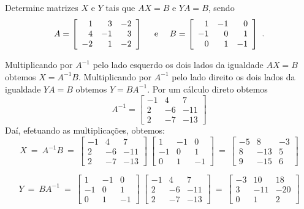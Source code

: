 \begin{problem}
Determine matrizes $X$ e $Y$ tais que $AX=B$ e $YA=B$, sendo
$$A = \left[\begin{array}{rrr}
	1 &  3 & -2  \\
	4 & -1 &  3  \\
 -2 &  1 & -2  \end{array}\right] \ \ \ \ {\rm e} \ \ \ \
B = \left[\begin{array}{rrr}
	1 & -1 &  0  \\
 -1 &  0 &  1  \\
	0 &  1 & -1  \end{array}\right] \ . $$
\end{problem}
\begin{solution}
Multiplicando por $A^{-1}$ pelo lado esquerdo os dois lados da igualdade \linebreak $AX=B$ obtemos $X = A^{-1} B$.
Multiplicando por $A^{-1}$ pelo lado direito  os dois \linebreak lados da igualdade $YA=B$ obtemos $Y = B A^{-1}$.
Por um cálculo direto obtemos 
$$A^{-1} = \left[ \begin{array}{rrr}
-1 &    4 &    7  \\
 2 &   -6 &  -11  \\
 2 &   -7 &  -13 
\end{array} \right]$$
Daí, efetuando as multiplicações, obtemos:
$$X\ =\ A^{-1} B\ =\ 
\left[ \begin{array}{rrr}
-1 &    4 &    7  \\
 2 &   -6 &  -11  \\
 2 &   -7 &  -13 
\end{array} \right]\ 
\left[\begin{array}{rrr}
	1 & -1 &  0  \\
 -1 &  0 &  1  \\
	0 &  1 & -1  \end{array}\right]\ =\ 
\left[\begin{array}{rrr}
 -5 &   8 & -3  \\
	8 & -13 &  5  \\
	9 & -15 &  6  \end{array}\right]$$

$$Y\ =\ B A^{-1}\ =\ 
\left[\begin{array}{rrr}
	1 & -1 &  0  \\
 -1 &  0 &  1  \\
	0 &  1 & -1  \end{array}\right]\ 
\left[ \begin{array}{rrr}
-1 &    4 &    7  \\
 2 &   -6 &  -11  \\
 2 &   -7 &  -13 
\end{array} \right]\ =\ 
\left[ \begin{array}{rrr}
 -3 &   10 &   18  \\
	3 &  -11 &  -20  \\
	0 &    1 &    2  
\end{array} \right]$$
\end{solution}

